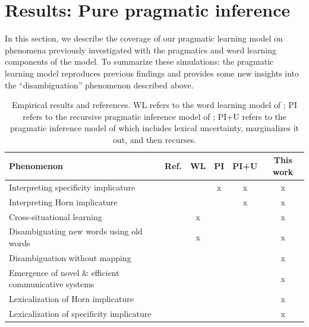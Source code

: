\documentclass{article} %
\newcommand{\word}{\text{word}}
\newcommand{\obj}{\text{object}}
\newcommand{\lex}{\text{lexicon}}
\begin{document}
%
%
%
%
%

\section{Results: Pure pragmatic inference}

In this section, we describe the coverage of our pragmatic learning model on phenomena previously investigated with the pragmatics and word learning components of the model. To summarize these simulations: the pragmatic learning model reproduces previous findings and provides some new insights into the ``disambiguation'' phenomenon described above. 

\begin{table}[t]
\label{tab:results}
\begin{center}
\begin{tabular}{lccccc}
\toprule
Phenomenon & Ref. & WL & PI & PI+U & This work \\
\midrule
Interpreting specificity implicature & \cite{grice1975} &  & x &x & x\\
Interpreting Horn implicature & \cite{horn1984} & &  & x& x\\
Cross-situational learning & \cite{smith2008} & x& & & x \\
Disambiguating new words using old words & \cite{markman1988} &x  & & & x \\
Disambiguation without mapping & \cite{horst2008} &  & & & x \\
Emergence of novel \& efficient communicative systems & \cite{galantucci2005} & & & & x \\
Lexicalization of Horn implicature & \cite{horn1984} & & & & x \\
Lexicalization of specificity implicature & \cite{levinson2000} & & & & x \\
\hline
\end{tabular}
\end{center}
\caption{Empirical results and references. WL refers to the word learning model of \cite{frank2009}; PI refers to the recursive pragmatic inference model of \cite{frank2012}; PI+U refers to the pragmatic inference model of \cite{bergen2012} which includes lexical uncertainty, marginalizes it out, and then recurses.}
\end{table}
\end{document}
